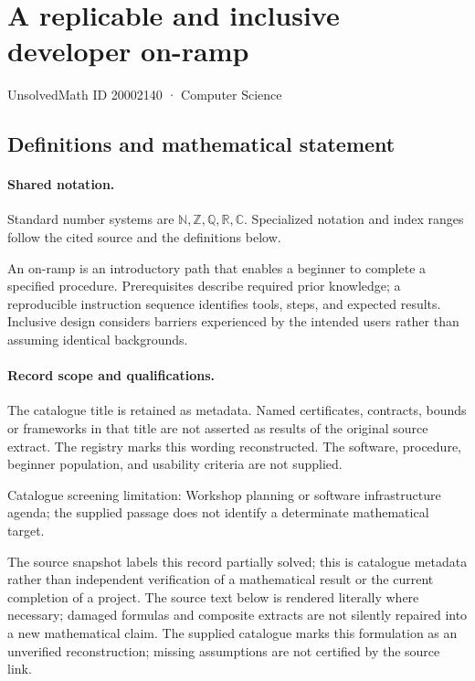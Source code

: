 \documentclass[11pt]{article}
\begin{document}
\setcounter{section}{20002139}
\section{A replicable and inclusive developer on-ramp}\label{20002140}
{\small\sffamily UnsolvedMath ID 20002140 · Computer Science}
\subsection{Definitions and mathematical statement}

\paragraph{Shared notation.}Standard number systems are $\mathbb N,\mathbb Z,\mathbb Q,\mathbb R,\mathbb C$. Specialized notation and index ranges follow the cited source and the definitions below.


An on-ramp is an introductory path that enables a beginner to complete a specified procedure. Prerequisites describe required prior knowledge; a reproducible instruction sequence identifies tools, steps, and expected results. Inclusive design considers barriers experienced by the intended users rather than assuming identical backgrounds.
\paragraph{Record scope and qualifications.}
The catalogue title is retained as metadata. Named certificates, contracts, bounds or frameworks in that title are not asserted as results of the original source extract.
The registry marks this wording reconstructed. The software, procedure, beginner population, and usability criteria are not supplied.

Catalogue screening limitation: Workshop planning or software infrastructure agenda; the supplied passage does not identify a determinate mathematical target.

The source snapshot labels this record partially solved; this is catalogue metadata rather than independent verification of a mathematical result or the current completion of a project.
The source text below is rendered literally where necessary; damaged formulas and composite extracts are not silently repaired into a new mathematical claim.
The supplied catalogue marks this formulation as an unverified reconstruction; missing assumptions are not certified by the source link.
\end{document}
